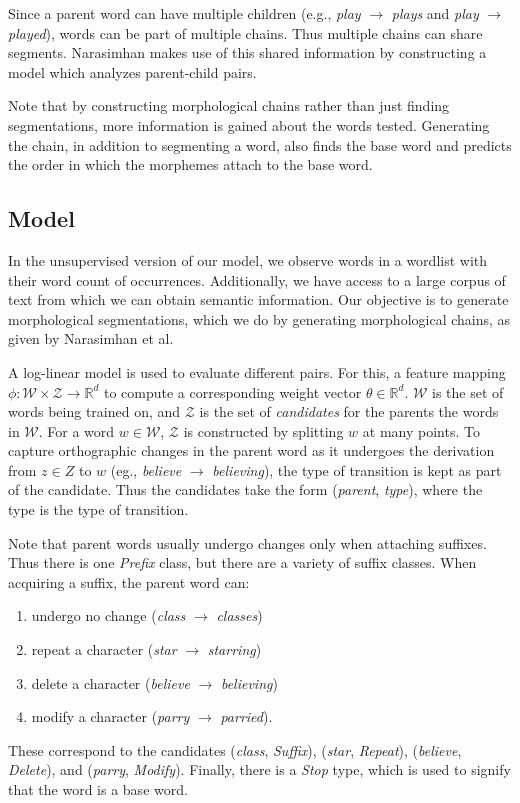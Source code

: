 \documentclass[11pt,twocolumn]{article}
\begin{document}
Since a parent word can have multiple children (e.g., \emph{play} $\rightarrow$ \emph{plays} and \emph{play} $\rightarrow$ \emph{played}), words can be part of multiple chains. Thus multiple chains can share segments. Narasimhan makes use of this shared information by constructing a model which analyzes parent-child pairs.

Note that by constructing morphological chains rather than just finding segmentations, more information is gained about the words tested. Generating the chain, in addition to segmenting a word, also finds the base word and predicts the order in which the morphemes attach to the base word.

\subsection{Model}

In the unsupervised version of our model, we observe words in a wordlist with their word count of occurrences. Additionally, we have access to a large corpus of text from which we can obtain semantic information. Our objective is to generate morphological segmentations, which we do by generating morphological chains, as given by Narasimhan et al.

A log-linear model is used to evaluate different pairs. For this, a feature mapping $\phi: \mathcal W \times \mathcal Z \rightarrow \mathbb R^d$ to compute a corresponding weight vector $\theta\in\mathbb R^d$. $\mathcal W$ is the set of words being trained on, and $\mathcal Z$ is the set of \emph{candidates} for the parents the words in $\mathcal W$. For a word $w\in\mathcal W$, $\mathcal Z$ is constructed by splitting $w$ at many points. To capture orthographic changes in the parent word as it undergoes the derivation from $z\in Z$ to $w$ (eg., \emph{believe} $\rightarrow$ \emph{believing}), the type of transition is kept as part of the candidate. Thus the candidates take the form (\emph{parent}, \emph{type}), where the type is the type of transition.

Note that parent words usually undergo changes only when attaching suffixes. Thus there is one \emph{Prefix} class, but there are a variety of suffix classes. When acquiring a suffix, the parent word can:
\begin{enumerate}
    \item undergo no change (\emph{class} $\rightarrow$ \emph{classes})
    \item repeat a character (\emph{star} $\rightarrow$ \emph{starring})
    \item delete a character (\emph{believe} $\rightarrow$ \emph{believing})
    \item modify a character (\emph{parry} $\rightarrow$ \emph{parried}).
\end{enumerate}
These correspond to the candidates (\emph{class}, \emph{Suffix}), (\emph{star}, \emph{Repeat}), (\emph{believe}, \emph{Delete}), and (\emph{parry}, \emph{Modify}). Finally, there is a \emph{Stop} type, which is used to signify that the word is a base word.
\end{document}
